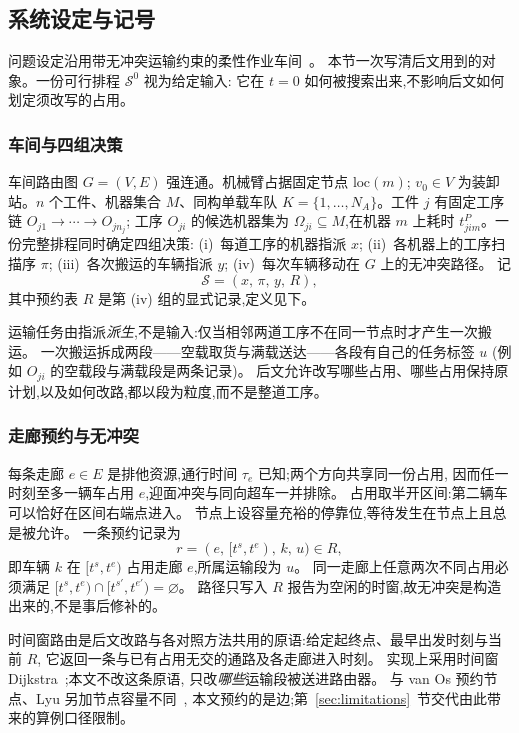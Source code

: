 \documentclass[manuscript,screen,review]{acmart}
\begin{document}
\subsection{系统设定与记号}
\label{sec:system_brief}

问题设定沿用带无冲突运输约束的柔性作业车间~\cite{vanos2026exact}。
本节一次写清后文用到的对象。一份可行排程 \(\mathcal{S}^0\) 视为给定输入:
它在 \(t=0\) 如何被搜索出来,不影响后文如何划定须改写的占用。

\subsubsection{车间与四组决策}
\label{sec:shop}

车间路由图 \(G=(V,E)\) 强连通。机械臂占据固定节点 \(\mathrm{loc}(m)\);
\(v_0\in V\) 为装卸站。\(n\) 个工件、机器集合 \(M\)、同构单载车队
\(K=\{1,\ldots,N_A\}\)。工件 \(j\) 有固定工序链 \(O_{j1}\to\cdots\to O_{jn_j}\);
工序 \(O_{ji}\) 的候选机器集为 \(\Omega_{ji}\subseteq M\),在机器 \(m\) 上耗时
\(t^P_{jim}\)。一份完整排程同时确定四组决策:
(i)~每道工序的机器指派 \(x\);
(ii)~各机器上的工序扫描序 \(\pi\);
(iii)~各次搬运的车辆指派 \(y\);
(iv)~每次车辆移动在 \(G\) 上的无冲突路径。
记
\[
\mathcal{S}=(x,\,\pi,\,y,\,R),
\]
其中预约表 \(R\) 是第 (iv) 组的显式记录,定义见下。

运输任务由指派\emph{派生},不是输入:仅当相邻两道工序不在同一节点时才产生一次搬运。
一次搬运拆成两段——空载取货与满载送达——各段有自己的任务标签 \(u\)
(例如 \(O_{ji}\) 的空载段与满载段是两条记录)。
后文允许改写哪些占用、哪些占用保持原计划,以及如何改路,都以段为粒度,而不是整道工序。

\subsubsection{走廊预约与无冲突}
\label{sec:reservation}

每条走廊 \(e\in E\) 是排他资源,通行时间 \(\tau_e\) 已知;两个方向共享同一份占用,
因而任一时刻至多一辆车占用 \(e\),迎面冲突与同向超车一并排除。
占用取半开区间:第二辆车可以恰好在区间右端点进入。
节点上设容量充裕的停靠位,等待发生在节点上且总是被允许。
一条预约记录为
\[
r=(e,\,[t^s,t^e),\,k,\,u)\in R,
\]
即车辆 \(k\) 在 \([t^s,t^e)\) 占用走廊 \(e\),所属运输段为 \(u\)。
同一走廊上任意两次不同占用必须满足
\([t^s,t^e)\cap[t^{s\prime},t^{e\prime})=\varnothing\)。
路径只写入 \(R\) 报告为空闲的时窗,故无冲突是构造出来的,不是事后修补的。

时间窗路由是后文改路与各对照方法共用的原语:给定起终点、最早出发时刻与当前 \(R\),
它返回一条与已有占用无交的通路及各走廊进入时刻。
实现上采用时间窗 Dijkstra~\cite{sun2023integrated};本文不改这条原语,
只改\emph{哪些}运输段被送进路由器。
与 van Os 预约节点、Lyu 另加节点容量不同~\cite{vanos2026exact,lyu2019approach},
本文预约的是边;第~\ref{sec:limitations}~节交代由此带来的算例口径限制。
\end{document}
